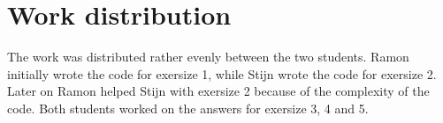\documentclass[twoside, a4paper, fleqn, reqno]{article}
\begin{document}
\section*{Work distribution}
The work was distributed rather evenly between the two students.
Ramon initially wrote the code for exersize 1, while Stijn wrote the code for exersize 2.
Later on Ramon helped Stijn with exersize 2 because of the complexity of the code.
Both students worked on the answers for exersize 3, 4 and 5.
\end{document}
